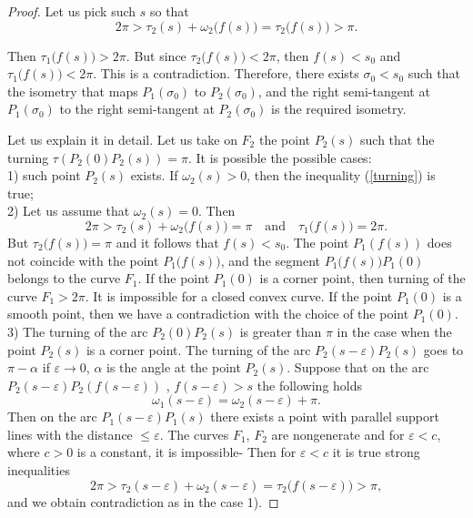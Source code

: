 \documentclass[10pt,a4paper]{amsart}
\begin{document}
\begin{proof}
Let us pick such $s$ so that
 \begin{equation}\label{turning}
    2\pi > \tau_2(s) + \omega_2\big(f(s)\big) = \tau_2\big(f(s)\big) > \pi.
 \end{equation}
 
Then $\tau_1\big(f(s)\big) > 2\pi$. But since $\tau_2\big(f(s)\big) < 2\pi$, then $f(s) < s_0$ and $\tau_1\big(f(s)\big) < 2\pi$. This is a contradiction. Therefore, there exists $\sigma_0 < s_0$ such that the isometry that maps $P_1(\sigma_0)$ to $P_2(\sigma_0)$, and the right semi-tangent at $P_1(\sigma_0)$ to the right semi-tangent at $P_2(\sigma_0)$ is the required isometry.

Let us explain it in detail. Let us take on $F_2$ the point $P_2(s)$ such that the turning 
$\tau(P_2(0)P_2(s))=\pi$. It is possible the possible cases: \\
1) such point $P_2(s)$ exists. If $\omega_2(s) >0$, then the inequality (\ref{turning}) is true; \\
2) Let us assume that $\omega_2(s)=0$. Then 
$$ 2\pi > \tau_2(s)+\omega_2\big(f(s)\big)=\pi \quad \text{and} \quad \tau_1\big(f(s)\big)=2\pi.$$
But $\tau_2\big(f(s)\big)= \pi$ and it follows that $f(s) < s_0$. The point $P_1(f(s))$ does not coincide
with  the point $P_1\big(f(s)\big)$, and the segment $P_1\big(f(s)\big)P_1(0)$ belongs to the curve $F_1$. 
If the point $P_1(0)$ is a corner point, then turning of the curve $F_1 >2\pi$. 
It is impossible for a closed convex curve. 
If the point $P_1(0)$ is a smooth point, then we have a contradiction with the choice of the point $P_1(0)$. \\
3) The turning of the arc $P_2(0)P_2(s)$ is greater than $\pi$ in the case when the point $P_2(s)$ is a corner point. The turning of the arc $P_2(s-\varepsilon)P_2(s)$ goes to $\pi - \alpha$ if $\varepsilon \to 0$, $\alpha$ is the angle at the point $P_2(s)$. 
Suppose that on the arc $P_2(s-\varepsilon)P_2(f(s-\varepsilon))$ , $f(s-\varepsilon) >s$ the following holds
$$\omega_1(s-\varepsilon) = \omega_2(s-\varepsilon) + \pi.$$
Then on the arc $P_1(s-\varepsilon)P_1(s)$ there exists a point with parallel support lines with the 
distance $\leq \varepsilon$. The curves $F_1$, $F_2$ are nongenerate and for $\varepsilon < c$, 
where $c >0$ is a constant, it is impossible- 
Then for $\varepsilon < c$ it is true strong inequalities
$$ 2\pi > \tau_2(s-\varepsilon) +  \omega_2(s-\varepsilon) =   \tau_2\big(f(s-\varepsilon)\big) > \pi,  $$
and we obtain contradiction as in the case 1).




\end{proof}
\end{document}

